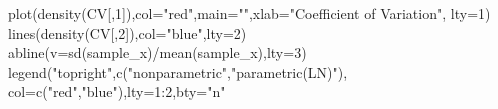 \documentclass[
]{book}
\newenvironment{Shaded}{\begin{snugshade}}{\end{snugshade}}
\newcommand{\AttributeTok}[1]{\textcolor[rgb]{0.77,0.63,0.00}{#1}}
\newcommand{\ConstantTok}[1]{\textcolor[rgb]{0.00,0.00,0.00}{#1}}
\newcommand{\ControlFlowTok}[1]{\textcolor[rgb]{0.13,0.29,0.53}{\textbf{#1}}}
\newcommand{\DecValTok}[1]{\textcolor[rgb]{0.00,0.00,0.81}{#1}}
\newcommand{\FloatTok}[1]{\textcolor[rgb]{0.00,0.00,0.81}{#1}}
\newcommand{\FunctionTok}[1]{\textcolor[rgb]{0.00,0.00,0.00}{#1}}
\newcommand{\NormalTok}[1]{#1}
\newcommand{\OtherTok}[1]{\textcolor[rgb]{0.56,0.35,0.01}{#1}}
\newcommand{\SpecialCharTok}[1]{\textcolor[rgb]{0.00,0.00,0.00}{#1}}
\newcommand{\StringTok}[1]{\textcolor[rgb]{0.31,0.60,0.02}{#1}}
\begin{document}
\begin{Shaded}
\end{Shaded}

\begin{Shaded}
\begin{Highlighting}[]
\FunctionTok{plot}\NormalTok{(}\FunctionTok{density}\NormalTok{(CV[,}\DecValTok{1}\NormalTok{]),}\AttributeTok{col=}\StringTok{"red"}\NormalTok{,}\AttributeTok{main=}\StringTok{""}\NormalTok{,}\AttributeTok{xlab=}\StringTok{"Coefficient of Variation"}\NormalTok{, }\AttributeTok{lty=}\DecValTok{1}\NormalTok{)}
\FunctionTok{lines}\NormalTok{(}\FunctionTok{density}\NormalTok{(CV[,}\DecValTok{2}\NormalTok{]),}\AttributeTok{col=}\StringTok{"blue"}\NormalTok{,}\AttributeTok{lty=}\DecValTok{2}\NormalTok{)}
\FunctionTok{abline}\NormalTok{(}\AttributeTok{v=}\FunctionTok{sd}\NormalTok{(sample\_x)}\SpecialCharTok{/}\FunctionTok{mean}\NormalTok{(sample\_x),}\AttributeTok{lty=}\DecValTok{3}\NormalTok{)}
\FunctionTok{legend}\NormalTok{(}\StringTok{"topright"}\NormalTok{,}\FunctionTok{c}\NormalTok{(}\StringTok{"nonparametric"}\NormalTok{,}\StringTok{"parametric(LN)"}\NormalTok{),}
       \AttributeTok{col=}\FunctionTok{c}\NormalTok{(}\StringTok{"red"}\NormalTok{,}\StringTok{"blue"}\NormalTok{),}\AttributeTok{lty=}\DecValTok{1}\SpecialCharTok{:}\DecValTok{2}\NormalTok{,}\AttributeTok{bty=}\StringTok{"n"}
\end{Highlighting}
\end{Shaded}
\end{document}
